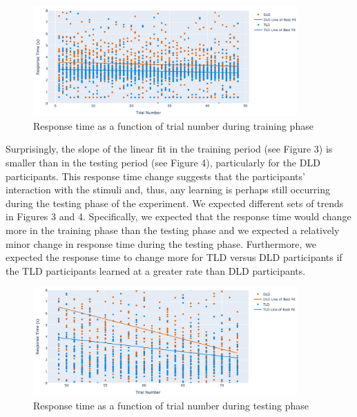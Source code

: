 \documentclass[
  letterpaper,
]{report}
\begin{document}
\begin{figure}

{\centering \includegraphics[width=0.9\textwidth,height=\textheight]{../../visualization/response_time_training.png}

}

\caption{Response time as a function of trial number during training
phase}

\end{figure}

Surprisingly, the slope of the linear fit in the training period (see
Figure 3) is smaller than in the testing period (see Figure 4),
particularly for the DLD participants. This response time change
suggests that the participants' interaction with the stimuli and, thus,
any learning is perhaps still occurring during the testing phase of the
experiment. We expected different sets of trends in Figures 3 and 4.
Specifically, we expected that the response time would change more in
the training phase than the testing phase and we expected a relatively
minor change in response time during the testing phase. Furthermore, we
expected the response time to change more for TLD versus DLD
participants if the TLD participants learned at a greater rate than DLD
participants.

\begin{figure}

{\centering \includegraphics[width=0.9\textwidth,height=\textheight]{../../visualization/response_time_testingphase.png}

}

\caption{Response time as a function of trial number during testing
phase}

\end{figure}
\end{document}

